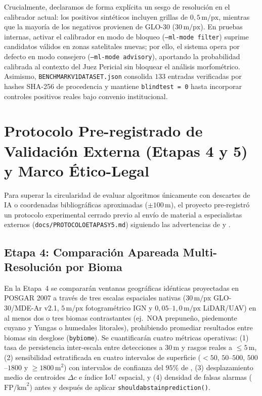 \documentclass[11pt,a4paper]{article}
\DeclareRobustCommand{\_}{\ifmmode\mbox{\textunderscore}\else\textunderscore\allowbreak\fi}
\begin{document}
Crucialmente, declaramos de forma expl\'icita un sesgo de resoluci\'on en el calibrador actual: los positivos sint\'eticos incluyen grillas de $0{,}5\,\mathrm{m/px}$, mientras que la mayor\'ia de los negativos provienen de GLO-30 ($30\,\mathrm{m/px}$). En pruebas internas, activar el calibrador en modo de bloqueo (\texttt{--ml-mode filter}) suprime candidatos v\'alidos en zonas satelitales nuevas; por ello, el sistema opera por defecto en modo consejero (\texttt{--ml-mode advisory}), aportando la probabilidad calibrada al contexto del Juez Pericial sin bloquear el an\'alisis morfom\'etrico. Asimismo, \texttt{BENCHMARK\_V1\_DATASET.json} consolida $133$ entradas verificadas por hashes SHA-256 de procedencia y mantiene \texttt{blind\_test = 0} hasta incorporar controles positivos reales bajo convenio institucional.

\FloatBarrier
\section{Protocolo Pre-registrado de Validaci\'on Externa (Etapas 4 y 5) y Marco \'Etico-Legal}

Para superar la circularidad de evaluar algoritmos \'unicamente con descartes de IA o coordenadas bibliogr\'aficas aproximadas ($\pm 100\,\mathrm{m}$), el proyecto pre-registr\'o un protocolo experimental cerrado previo al env\'io de material a especialistas externos (\texttt{docs/PROTOCOLO\_ETAPAS\_4\_Y\_5.md}) siguiendo las advertencias de \citet{Casana2021} y \citet{Vinci2024}.

\subsection{Etapa 4: Comparaci\'on Apareada Multi-Resoluci\'on por Bioma}

En la Etapa~4 se comparar\'an ventanas geogr\'aficas id\'enticas proyectadas en POSGAR 2007 a trav\'es de tres escalas espaciales nativas ($30\,\mathrm{m/px}$ GLO-30/MDE-Ar v2.1, $5\,\mathrm{m/px}$ fotogram\'etrico IGN y $0{,}05$--$1{,}0\,\mathrm{m/px}$ LiDAR/UAV) en al menos dos o tres biomas contrastantes (ej.\ NOA prepune\~no, piedemonte cuyano y Yungas o humedales litorales), prohibiendo promediar resultados entre biomas sin desglose (\texttt{by\_biome}). Se cuantificar\'an cuatro m\'etricas operativas: (1) tasa de persistencia inter-escala entre detecciones a $30\,\mathrm{m}$ y rasgos reales a $\le 5\,\mathrm{m}$, (2) sensibilidad estratificada en cuatro intervalos de superficie ($<50$, $50$--$500$, $500$--$1800$ y $\ge 1800\,\mathrm{m}^2$) con intervalos de confianza del $95\%$ de \citet{Wilson1927}, (3) desplazamiento medio de centroides $\Delta c$ e \'indice $\mathrm{IoU}$ espacial, y (4) densidad de falsas alarmas ($\mathrm{FP/km}^2$) antes y despu\'es de aplicar \texttt{should\_abstain\_prediction()}.
\end{document}
